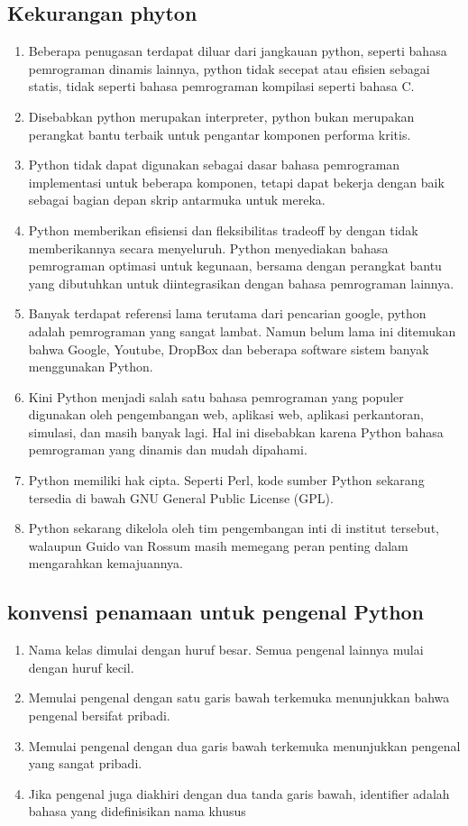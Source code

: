 \subsection{Kekurangan phyton}
\begin{enumerate}
    \item Beberapa penugasan terdapat diluar dari jangkauan python,
    seperti bahasa pemrograman dinamis lainnya, python tidak
    secepat atau efisien sebagai statis, tidak seperti bahasa
    pemrograman kompilasi seperti bahasa C.
    \item Disebabkan python merupakan interpreter, python bukan
    merupakan perangkat bantu terbaik untuk pengantar komponen performa kritis.
    \item Python tidak dapat digunakan sebagai dasar bahasa pemrograman implementasi untuk beberapa komponen, tetapi
    dapat bekerja dengan baik sebagai bagian depan skrip antarmuka untuk mereka.
    \item Python memberikan efisiensi dan fleksibilitas tradeoff by
    dengan tidak memberikannya secara menyeluruh. Python
    menyediakan bahasa pemrograman optimasi untuk kegunaan, bersama dengan perangkat bantu yang dibutuhkan
    untuk diintegrasikan dengan bahasa pemrograman lainnya.
    \item Banyak terdapat referensi lama terutama dari pencarian
    google, python adalah pemrograman yang sangat lambat.
    Namun belum lama ini ditemukan bahwa Google, Youtube,
    DropBox dan beberapa software sistem banyak menggunakan Python.
    \item Kini Python menjadi salah satu bahasa pemrograman yang
    populer digunakan oleh pengembangan web, aplikasi web,
    aplikasi perkantoran, simulasi, dan masih banyak lagi. Hal
    ini disebabkan karena Python bahasa pemrograman yang
    dinamis dan mudah dipahami.
    \item Python memiliki hak cipta. Seperti Perl, kode sumber
    Python sekarang tersedia di bawah GNU General Public
    License (GPL).
    \item Python sekarang dikelola oleh tim pengembangan inti
    di institut tersebut, walaupun Guido van Rossum masih
    memegang peran penting dalam mengarahkan kemajuannya.
\end{enumerate}

\subsection{konvensi penamaan untuk pengenal Python}
\begin{enumerate}
    \item Nama kelas dimulai dengan huruf besar. Semua pengenal lainnya mulai dengan huruf kecil.
    \item Memulai pengenal dengan satu garis bawah terkemuka menunjukkan bahwa pengenal bersifat pribadi.
    \item Memulai pengenal dengan dua garis bawah terkemuka menunjukkan pengenal yang sangat pribadi.
    \item Jika pengenal juga diakhiri dengan dua tanda garis bawah, identifier adalah bahasa yang didefinisikan nama khusus
\end{enumerate}

